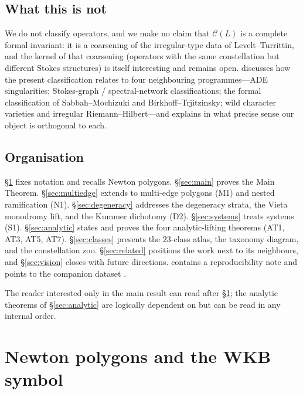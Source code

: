 \documentclass[11pt,a4paper]{article}
\theoremstyle{plain}
\theoremstyle{definition}
\theoremstyle{remark}
\newcommand{\Cl}{\mathcal{C}}
\begin{document}
\subsection{What this is not}\label{ssec:intro-scope}

We do not classify operators, and we make no claim that $\Cl(L)$ is a
complete formal invariant: it is a coarsening of the irregular-type data
of Levelt--Turrittin, and the kernel of that coarsening (operators with the
same constellation but different Stokes structures) is itself interesting
and remains open.  discusses how the present
classification relates to four neighbouring programmes---ADE
singularities; Stokes-graph / spectral-network classifications; the
formal classification of Sabbah--Mochizuki and Birkhoff--Trjitzinsky;
wild character varieties and irregular Riemann--Hilbert---and explains in
what precise sense our object is orthogonal to each.

\subsection{Organisation}\label{ssec:intro-organisation}

\S\ref{sec:prelim} fixes notation and recalls Newton polygons. \S\ref{sec:main}
proves the Main Theorem. \S\ref{sec:multiedge} extends to multi-edge polygons
(M1) and nested ramification (N1). \S\ref{sec:degeneracy} addresses the
degeneracy strata, the Vieta monodromy lift, and the Kummer dichotomy (D2).
\S\ref{sec:systems} treats systems (S1). \S\ref{sec:analytic} states and
proves the four analytic-lifting theorems (AT1, AT3, AT5, AT7).
\S\ref{sec:classes} presents the $23$-class atlas, the taxonomy diagram, and
the constellation zoo. \S\ref{sec:related} positions the work next to its
neighbours, and \S\ref{sec:vision} closes with future directions.
 contains a reproducibility note and points to
the companion dataset \cite{wkb_dataset_v1}.

\bigskip
The reader interested only in the main result can read
 after \S\ref{sec:prelim}; the
analytic theorems of \S\ref{sec:analytic} are logically dependent on
 but can be read in any internal order.


\section{Newton polygons and the WKB symbol}\label{sec:prelim}
\end{document}
